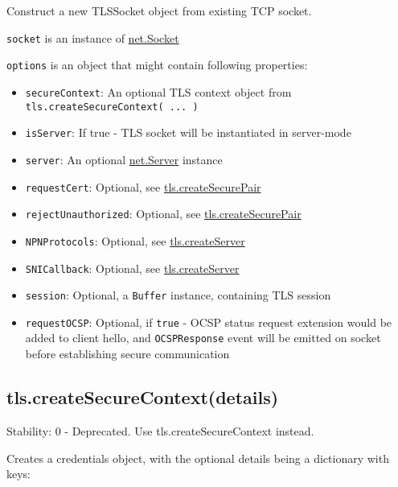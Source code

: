 Construct a new TLSSocket object from existing TCP socket.

\texttt{socket} is an instance of
\href{net.html\#net_class_net_socket}{net.Socket}

\texttt{options} is an object that might contain following properties:

\begin{itemize}
\item
  \texttt{secureContext}: An optional TLS context object from
  \texttt{tls.createSecureContext( ... )}
\item
  \texttt{isServer}: If true - TLS socket will be instantiated in
  server-mode
\item
  \texttt{server}: An optional
  \href{net.html\#net_class_net_server}{net.Server} instance
\item
  \texttt{requestCert}: Optional, see
  \hyperref[tlsux5ftlsux5fcreatesecurepairux5fcredentialsux5fisserverux5frequestcertux5frejectunauthorized]{tls.createSecurePair}
\item
  \texttt{rejectUnauthorized}: Optional, see
  \hyperref[tlsux5ftlsux5fcreatesecurepairux5fcredentialsux5fisserverux5frequestcertux5frejectunauthorized]{tls.createSecurePair}
\item
  \texttt{NPNProtocols}: Optional, see
  \hyperref[tlsux5ftlsux5fcreateserverux5foptionsux5fsecureconnectionlistener]{tls.createServer}
\item
  \texttt{SNICallback}: Optional, see
  \hyperref[tlsux5ftlsux5fcreateserverux5foptionsux5fsecureconnectionlistener]{tls.createServer}
\item
  \texttt{session}: Optional, a \texttt{Buffer} instance, containing TLS
  session
\item
  \texttt{requestOCSP}: Optional, if \texttt{true} - OCSP status request
  extension would be added to client hello, and \texttt{OCSPResponse}
  event will be emitted on socket before establishing secure
  communication
\end{itemize}

\subsection{tls.createSecureContext(details)}\label{tls.createsecurecontextdetails}

Stability: 0 - Deprecated. Use tls.createSecureContext instead.

Creates a credentials object, with the optional details being a
dictionary with keys:

